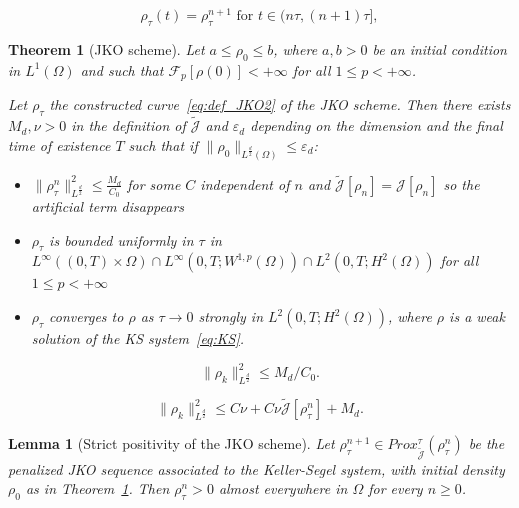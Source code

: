 \documentclass[10pt,a4paper]{amsart}
\newtheorem{thm}{Theorem}
\newtheorem{lemma}{Lemma}
\renewcommand{\color}[2][]{}
\newcommand{\eps}{\varepsilon}
\begin{document}
\begin{equation}\label{eq:def_JKO2}
\rho_\tau(t) = \rho_\tau^{n+1} \text{ for } t \in (n\tau, (n+1)\tau],
\end{equation}

\begin{thm}[JKO scheme]\label{thm:JKO}
Let $a\le \rho_{0}\le b$, where $a,b>0$ be an initial condition in $L^1(\Omega)$ and such that $\mathcal{F}_{p}[\rho(0)]<+\infty$ for all $1\le p<+\infty$. {\color{blue} Let $\rho_{\tau}$ the constructed curve~\eqref{eq:def_JKO2} of the JKO scheme.   Then there exists  $M_d,\nu >0$ in the definition of $\widetilde{\mathcal{J}}$  and $\eps_{d}$ depending on the dimension and the final time of existence $T$ such that if $\|\rho_0\|_{L^{\frac{d}{2}}(\Omega)}\le \eps_d$:
\begin{itemize}
    \item $\|\rho_{\tau}^{n}\|_{L^{\frac d2}}^2\le \frac{M_d}{C_0}$ for some $C$ independent of $n$ and $\widetilde{\mathcal J}[\rho_n]=\mathcal J[\rho_n]$ so the artificial term disappears
    \item $\rho_{\tau}$ is bounded uniformly in $\tau$ in $L^{\infty}((0,T)\times\Omega)\cap L^{\infty}(0,T; W^{1,p}(\Omega))\cap L^{2}(0,T; H^{2}(\Omega))$ for all $1\le p<+\infty$
    \item $\rho_{\tau}$ converges to $\rho$ as $\tau\to 0$ strongly in $L^{2}(0,T; H^{2}(\Omega))$, where $\rho$ is a weak solution of the KS system~\eqref{eq:KS}.
\end{itemize}}
\end{thm}

\begin{equation}\label{eq:JKO_Ld2_1}
 \|\rho_k\|_{L^{\frac d2}}^2\le M_d/C_0   .
\end{equation}

\begin{equation}\label{eq:JKO_Ld2_2}
\|\rho_k\|_{L^{\frac d2}}^2\le C\nu+ C\nu \widetilde{\mathcal{J}}[\rho_\tau^n]+ M_d.
\end{equation}

\begin{lemma}[Strict positivity of the JKO scheme]\label{lem:strict_positivy}
Let $\rho^{n+1}_{\tau}\in Prox_{\widetilde{\mathcal{J}}}^{\tau}(\rho^{n}_{\tau})$ be the penalized JKO sequence
associated to the Keller-Segel system, with initial density $\rho_0$ as in Theorem~\ref{thm:JKO}.
Then $\rho^n_\tau>0$ almost everywhere in $\Omega$ for every $n\ge 0$.
\end{lemma}
\end{document}
